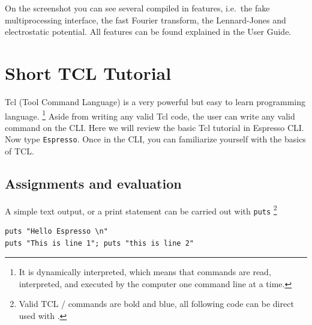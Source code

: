 \documentclass[
paper=a4,                       %
fontsize=11pt,                  %
twoside,                        %
footsepline,                    %
headsepline,                    %
headinclude=false,              %
footinclude=false,              %
pagesize,                       %
]{scrartcl}
\newtheorem{task}{Task}
\begin{document}
\vspace{1cm}\vspace{1cm}

On the screenshot you can see several compiled in features, i.e.~the fake multiprocessing interface, the fast Fourier transform, the Lennard-Jones and electrostatic potential. All features can be found explained in the \es{} User Guide.

 \section{Short TCL Tutorial}\label{sec:tcl}

   Tcl (Tool Command Language) is a very powerful but easy to learn programming
   language. \footnote{It is dynamically interpreted, which means that commands are read,
   interpreted, and executed by the computer one command line at a time.} 
   Aside from writing any valid Tcl code, the user can write any valid \es{}
   command on the \es{} CLI. Here we will review the 
   basic Tcl tutorial \cite{tcl_tut_url} in Espresso CLI. Now type 
   \texttt{Espresso}. Once in the CLI, you can familiarize yourself with the 
   basics of TCL. 
   
    \subsection{Assignments and evaluation}
     A simple text output, or a print statement can be carried out with 
     \lstinline|puts| \footnote{Valid TCL / \es{} commands are bold and blue, all following code can be direct used with \es{}.}
      

{\vspace{0,2cm}\small
\begin{lstlisting}[numbers=none]
puts "Hello Espresso \n"
puts "This is line 1"; puts "this is line 2"
\end{lstlisting}\vspace{0,2cm}
}
\end{document}
